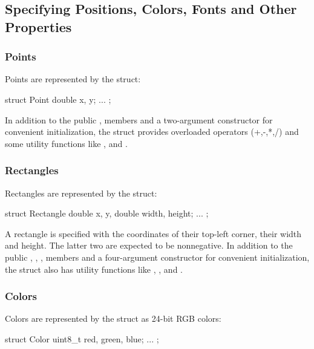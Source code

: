 \subsection{Specifying Positions, Colors, Fonts and Other Properties}
\label{sec:graphics:figure-positions-colors-fonts-etc}

\subsubsection{Points}
\label{sec:graphics:canvas-points}

Points are represented by the  struct:

\begin{cpp}
struct Point {
    double x, y;
    ...
};
\end{cpp}

In addition to the public ,  members and a two-argument
constructor for convenient initialization, the struct provides overloaded
operators (+,-,*,/) and some utility functions like ,
 and .

\subsubsection{Rectangles}
\label{sec:graphics:canvas-rectangles}

Rectangles are represented by the  struct:

\begin{cpp}
struct Rectangle {
    double x, y,
    double width, height;
    ...
};
\end{cpp}

A rectangle is specified with the coordinates of their top-left corner,
their width and height. The latter two are expected to be nonnegative. In
addition to the public , , ,  members
and a four-argument constructor for convenient initialization, the struct
also has utility functions like , ,
 and .

\subsubsection{Colors}
\label{sec:graphics:canvas-colors}

Colors are represented by the  struct as 24-bit RGB colors:

\begin{cpp}
struct Color {
    uint8_t red, green, blue;
    ...
};
\end{cpp}

